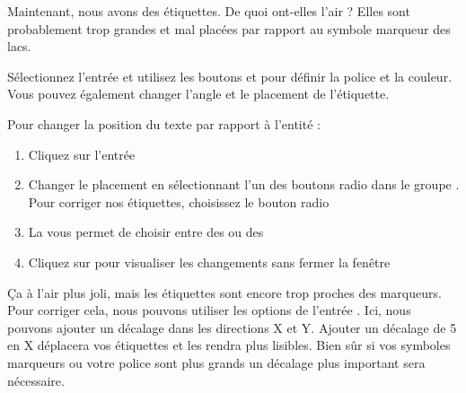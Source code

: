 Maintenant, nous avons des étiquettes. De quoi ont-elles l'air ? Elles sont probablement trop grandes et mal placées par rapport au symbole marqueur des lacs.

Sélectionnez l'entrée  et utilisez les boutons  et  pour définir la police et la couleur. Vous pouvez également changer l'angle et le placement de l'étiquette.

Pour changer la position du texte par rapport à l'entité :

\begin{enumerate}
\item Cliquez sur l'entrée 
\item Changer le placement en sélectionnant l'un des boutons radio dans le groupe . Pour corriger nos étiquettes, choisissez le bouton radio 
\item La  vous permet de choisir entre  des  ou des 
\item Cliquez sur  pour visualiser les changements sans fermer la fenêtre
\end{enumerate}

Ça à l'air plus joli, mais les étiquettes sont encore trop proches des marqueurs. Pour corriger cela, nous pouvons utiliser les options de l'entrée . Ici, nous pouvons ajouter un décalage dans les directions X et Y. Ajouter un décalage de 5 en X déplacera vos étiquettes et les rendra plus lisibles. Bien sûr si vos symboles marqueurs ou votre police sont plus grands un décalage plus important sera nécessaire.

